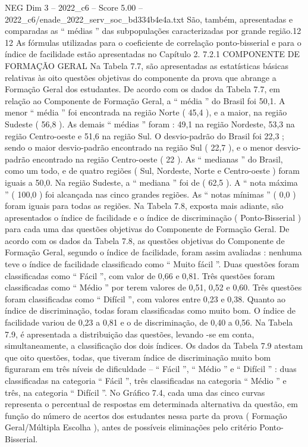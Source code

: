 \begin{textsample}{NEG Dim 3 – 2022\_c6 – Score 5.00 – 2022\_c6/enade\_2022\_serv\_soc\_bd334b4e4a.txt}
São, também, apresentadas e comparadas as “ médias ” das subpopulações caracterizadas por grande região.12 12 As fórmulas utilizadas para o coeficiente de correlação ponto-bisserial e para o índice de facilidade estão apresentadas no Capítulo 2. 7.2.1 COMPONENTE DE FORMAÇÃO GERAL Na Tabela 7.7, são apresentadas as estatísticas básicas relativas às oito questões objetivas do componente da prova que abrange a Formação Geral dos estudantes.
De acordo com os dados da Tabela 7.7, em relação ao Componente de Formação Geral, a “ média ” do Brasil foi 50,1.
A menor “ média ” foi encontrada na região Norte ( 45,4 ), e a maior, na região Sudeste ( 56,8 ).
As demais “ médias ” foram : 49,1 na região Nordeste, 53,3 na região Centro-oeste e 51,6 na região Sul.
O desvio-padrão do Brasil foi 22,3 ; sendo o maior desvio-padrão encontrado na região Sul ( 22,7 ), e o menor desvio-padrão encontrado na região Centro-oeste ( 22 ).
As “ medianas ” do Brasil, como um todo, e de quatro regiões ( Sul, Nordeste, Norte e Centro-oeste ) foram iguais a 50,0.
Na região Sudeste, a “ mediana ” foi de ( 62,5 ).
A “ nota máxima ” ( 100,0 ) foi alcançada nas cinco grandes regiões.
As “ notas mínimas ” ( 0,0 ) foram iguais para todas as regiões.
Na Tabela 7.8, exposta mais adiante, são apresentados o índice de facilidade e o índice de discriminação ( Ponto-Bisserial ) para cada uma das questões objetivas do Componente de Formação Geral.
De acordo com os dados da Tabela 7.8, as questões objetivas do Componente de Formação Geral, segundo o índice de facilidade, foram assim avaliadas : nenhuma teve o índice de facilidade classificado como “ Muito fácil ”.
Duas questões foram classificadas como “ Fácil ”, com valor de 0,66 e 0,81.
Três questões foram classificadas como “ Médio ” por terem valores de 0,51, 0,52 e 0,60.
Três questões foram classificadas como “ Difícil ”, com valores entre 0,23 e 0,38.
Quanto ao índice de discriminação, todas foram classificadas como muito bom.
O índice de facilidade variou de 0,23 a 0,81 e o de discriminação, de 0,40 a 0,56.
Na Tabela 7.9, é apresentada a distribuição das questões, levando -se em conta, simultaneamente, a classificação dos dois índices.
Os dados da Tabela 7.9 atestam que oito questões, todas, que tiveram índice de discriminação muito bom figuraram em três níveis de dificuldade – “ Fácil ”, “ Médio ” e “ Difícil ” : duas classificadas na categoria “ Fácil ”, três classificadas na categoria “ Médio ” e três, na categoria “ Difícil ”.
No Gráfico 7.4, cada uma das cinco curvas representa o percentual de respostas em determinada alternativa da questão, em função do número de acertos dos estudantes nessa parte da prova ( Formação Geral/Múltipla Escolha ), antes de possíveis eliminações pelo critério Ponto-Bisserial.

\end{textsample}
